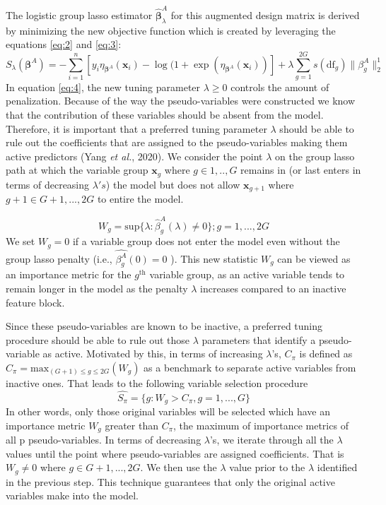 The logistic group lasso estimator $\pmb{\hat\beta}_{\lambda}^A$ for this augmented design matrix is derived by minimizing the new objective function which is created by leveraging the equations \eqref{eq:2} and \eqref{eq:3}:
\begin{equation}\label{eq:4}
S_{\lambda}(\pmb{\beta}^A) = -\sum_{i=1}^{n}[y_i\eta_{\pmb{\beta}^A}(\mathbf{x}_i)-\log(1+\exp(\eta_{\pmb{\beta}^A}(\mathbf{x}_i))]+\lambda\sum_{g=1}^{2G} s(\text{df}_g)\|\beta_g^A\|_2^1
\end{equation}
In equation \eqref{eq:4}, the new tuning parameter $\lambda\ge 0$ controls the amount of penalization. Because of the way the pseudo-variables were constructed we know that the contribution of these variables should be absent from the model. Therefore, it is important that a preferred tuning parameter $\lambda$ should be able to rule out the coefficients that are assigned to the pseudo-variables making them active predictors (\cite{permassisttune}Yang \textit{et al.}, 2020). We consider the point $\lambda$ on the group lasso path at which the variable group $\mathbf{x}_{g}$ where $g\in 1,..,G$ remains in (or last enters in terms of decreasing $\lambda's$) the model but does not allow $\mathbf{x}_{g+1}$ where $g+1 \in G+1,...,2G$ to entire the model.\par
\begin{equation}\label{eq:pat_eq1}
W_g =\text{sup}\{\lambda: \hat{\beta}^A_g(\lambda)\ne 0\}; g=1,...,2G
\end{equation}
We set $W_g=0$ if a variable group does not enter the model even without the group lasso penalty (i.e., $\hat{\beta^A_g}(0)=0$ ). This new statistic $W_g$ can be viewed as an importance metric for the $g^{\text{th}}$ variable group, as an active variable tends to remain longer in the model as the penalty $\lambda$ increases compared to an inactive feature block.\par
Since these pseudo-variables are known to be inactive, a preferred tuning procedure should be able to rule out those $\lambda$ parameters that identify a pseudo-variable as active. Motivated by this, in terms of increasing $\lambda$'s, $C_{\pi}$ is defined as $C_{\pi}= \text{max}_{(G+1)\le g\le 2G}(W_g)$ as a benchmark to separate active variables from inactive ones. That leads to the following variable selection procedure
\begin{equation}\label{eq:pat_eq2}
\hat{S_{\pi}} = \{g: W_g>C_{\pi}, g=1,...,G\}
\end{equation}
In other words, only those original variables will be selected which have an importance metric $W_g$ greater than $C_{\pi}$, the maximum of importance metrics of all p pseudo-variables. In terms of decreasing $\lambda$'s, we iterate through all the $\lambda$ values until the point where pseudo-variables are assigned coefficients. That is $W_g\ne 0$ where $g\in G+1,...,2G$. We then use the $\lambda$ value prior to the $\lambda$ identified in the previous step. This technique guarantees that only the original active variables make into the model.\par
